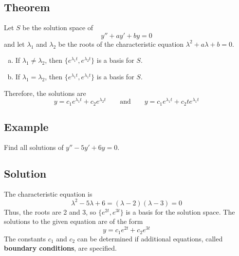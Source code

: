 \subsection*{Theorem}
Let $S$ be the solution space of
\[y''+ay'+by=0\]
and let $\lambda_1$ and $\lambda_2$ be the roots of the characteristic equation
$\lambda^2 + a\lambda + b = 0$.
\begin{enumerate}[(a)]
    \item If $\lambda_1\neq\lambda_2$, then $\{e^{\lambda_1t},e^{\lambda_2t}\}$ is a basis for $S$.
    \item If $\lambda_1=\lambda_2$, then $\{e^{\lambda_1t},e^{\lambda_1t}\}$ is a basis for $S$.
\end{enumerate}
Therefore, the solutions are
\[y=c_1e^{\lambda_1t}+c_2e^{\lambda_2t} \qquad \text{and} \qquad y=c_1e^{\lambda_1t}+c_2te^{\lambda_1t}\]

\subsection*{Example}
Find all solutions of $y''-5y'+6y=0$.

\subsection*{Solution}
The characteristic equation is
\[\lambda^2-5\lambda+6=(\lambda-2)(\lambda-3)=0\]
Thus, the roots are 2 and 3, so $\{e^{2t},e^{3t}\}$ is a basis for the solution space.
The solutions to the given equation are of the form
\[y=c_1e^{2t}+c_2e^{3t}\]
The constants $c_1$ and $c_2$ can be determined if additional equations, called \textbf{boundary conditions}, are specified.